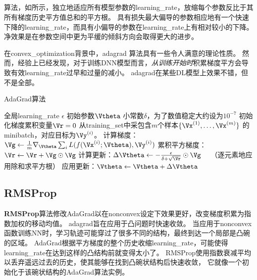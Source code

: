 \subsection{}
\label{sec:adagrad}
算法，如所示，独立地适应所有模型参数的\gls{learning_rate}，放缩每个参数反比于其所有梯度历史平方值总和的平方根\citep{Duchi+al-2011}。
具有损失最大偏导的参数相应地有一个快速下降的\gls{learning_rate}，而具有小偏导的参数在\gls{learning_rate}上有相对较小的下降。
净效果是在参数空间中更为平缓的倾斜方向会取得更大的进步。


在\gls{convex_optimization}背景中，\gls{adagrad} 算法具有一些令人满意的理论性质。
然而，经验上已经发现，对于训练\gls{DNN}模型而言，\emph{从训练开始时}积累梯度平方会导致有效\gls{learning_rate}过早和过量的减小。
\gls{adagrad}在某些\gls{DL}模型上效果不错，但不是全部。


\begin{algorithm}[ht]
\caption{AdaGrad算法}
\label{alg:ada_grad}
\begin{algorithmic}
\REQUIRE 全局\gls{learning_rate} $\epsilon$
\REQUIRE 初始参数$\Vtheta$
\REQUIRE 小常数$\delta$，为了数值稳定大约设为$10^{-7}$
\STATE 初始化梯度累积变量$\Vr = 0$
    \STATE 从\gls{training_set}中采包含$m$个样本$\{ \Vx^{(1)},\dots, \Vx^{(m)}\}$ 的\gls{minibatch}，对应目标为$\Vy^{(i)}$。
    \STATE 计算梯度： $\Vg \leftarrow  
         \frac{1}{m} \nabla_{\Vtheta} \sum_i L(f(\Vx^{(i)};\Vtheta),\Vy^{(i)})$ 
    \STATE 累积平方梯度：$\Vr \leftarrow \Vr + \Vg \odot \Vg$
    \STATE 计算更新：$\Delta \Vtheta \leftarrow -
    \frac{\epsilon}{\delta+ \sqrt{\Vr}} \odot\Vg$  \ \  （逐元素地应用除和求平方根）
    \STATE 应用更新：$\Vtheta \leftarrow \Vtheta + \Delta \Vtheta$
\ENDWHILE
\end{algorithmic}
\end{algorithm}


\subsection{RMSProp}
\label{sec:rmsprop}
\textbf{RMSProp}算法\citep{Hinton-ipam2012}修改AdaGrad以在\gls{nonconvex}设定下效果更好，改变梯度积累为指数加权的移动均值。
\gls{adagrad}旨在应用于凸问题时快速收敛。
当应用于\gls{nonconvex}函数训练\gls{NN}时，学习轨迹可能穿过了很多不同的结构，最终到达一个局部是凸碗的区域。
AdaGrad根据平方梯度的整个历史收缩\gls{learning_rate}，可能使得\gls{learning_rate}在达到这样的凸结构前就变得太小了。
RMSProp使用指数衰减平均以丢弃遥远过去的历史，使其能够在找到凸碗状结构后快速收敛，
它就像一个初始化于该碗状结构的AdaGrad算法实例。


